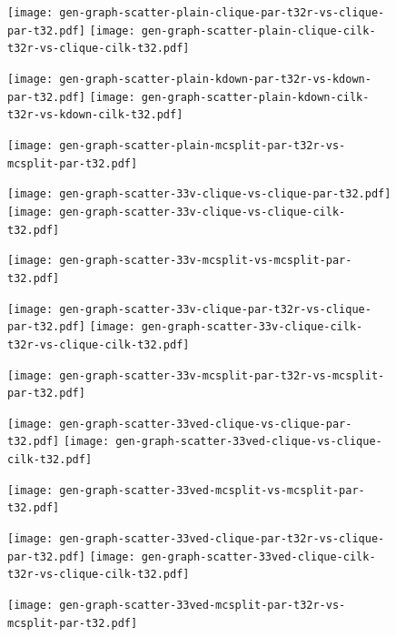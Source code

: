 \documentclass{llncs}
\begin{document}
\begin{figure}[p]
    \texttt{[image: gen-graph-scatter-plain-clique-par-t32r-vs-clique-par-t32.pdf]}
    \hfill
    \texttt{[image: gen-graph-scatter-plain-clique-cilk-t32r-vs-clique-cilk-t32.pdf]}

    \vspace*{1em}

    \texttt{[image: gen-graph-scatter-plain-kdown-par-t32r-vs-kdown-par-t32.pdf]}
    \hfill
    \texttt{[image: gen-graph-scatter-plain-kdown-cilk-t32r-vs-kdown-cilk-t32.pdf]}

    \vspace*{1em}

    \texttt{[image: gen-graph-scatter-plain-mcsplit-par-t32r-vs-mcsplit-par-t32.pdf]}

\end{figure}

\begin{figure}[p]
    \texttt{[image: gen-graph-scatter-33v-clique-vs-clique-par-t32.pdf]}
    \hfill
    \texttt{[image: gen-graph-scatter-33v-clique-vs-clique-cilk-t32.pdf]}

    \vspace*{1em}

    \texttt{[image: gen-graph-scatter-33v-mcsplit-vs-mcsplit-par-t32.pdf]}
\end{figure}

\begin{figure}[p]
    \texttt{[image: gen-graph-scatter-33v-clique-par-t32r-vs-clique-par-t32.pdf]}
    \hfill
    \texttt{[image: gen-graph-scatter-33v-clique-cilk-t32r-vs-clique-cilk-t32.pdf]}

    \vspace*{1em}

    \texttt{[image: gen-graph-scatter-33v-mcsplit-par-t32r-vs-mcsplit-par-t32.pdf]}

\end{figure}

\begin{figure}[p]
    \texttt{[image: gen-graph-scatter-33ved-clique-vs-clique-par-t32.pdf]}
    \hfill
    \texttt{[image: gen-graph-scatter-33ved-clique-vs-clique-cilk-t32.pdf]}

    \vspace*{1em}

    \texttt{[image: gen-graph-scatter-33ved-mcsplit-vs-mcsplit-par-t32.pdf]}
\end{figure}

\begin{figure}[p]
    \texttt{[image: gen-graph-scatter-33ved-clique-par-t32r-vs-clique-par-t32.pdf]}
    \hfill
    \texttt{[image: gen-graph-scatter-33ved-clique-cilk-t32r-vs-clique-cilk-t32.pdf]}

    \vspace*{1em}

    \texttt{[image: gen-graph-scatter-33ved-mcsplit-par-t32r-vs-mcsplit-par-t32.pdf]}

\end{figure}
\end{document}
